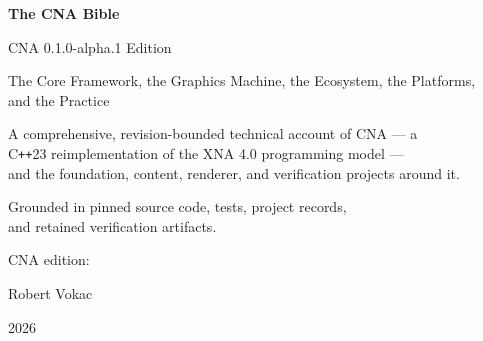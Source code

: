 \begin{titlepage}
\centering
\vspace*{3cm}
{\Huge\bfseries The CNA Bible\par}
\vspace{0.6cm}
{\LARGE CNA 0.1.0-alpha.1 Edition\par}
\vspace{0.6cm}
{\large The Core Framework, the Graphics Machine, the Ecosystem, the Platforms,\\
and the Practice\par}
\vspace{2.5cm}
{\large A comprehensive, revision-bounded technical account of CNA --- a\\
C\texttt{++}23 reimplementation of the XNA 4.0 programming model ---\\
and the foundation, content, renderer, and verification projects around it.\par}
\vspace{2.7cm}
{\large Grounded in pinned source code, tests, project records,\\
and retained verification artifacts.\par}
\vspace{0.8cm}
{\normalsize CNA edition: \CnaEditionTag\par}
{\normalsize \CnaRevision\par}
{\normalsize \CnaEditionDate\par}
\vspace{2cm}
{\Large Robert Vokac\par}
\vfill
{\large 2026\par}
\end{titlepage}

